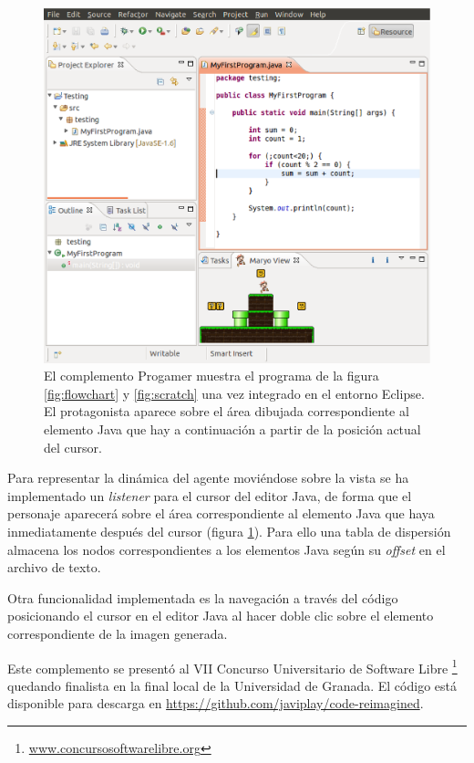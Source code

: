 \documentclass{llncs}
\begin{document}
\begin{figure}[ht]
\begin{center}
\includegraphics[scale=0.5]{images/eclipse.eps}
\caption{El complemento Progamer muestra el programa de la figura \ref{fig:flowchart} y \ref{fig:scratch} una vez integrado en el entorno Eclipse. El protagonista aparece sobre el área dibujada correspondiente al elemento Java que hay a continuación a partir de la posición actual del cursor.
\label{fig:eclipse}}
\end{center}
\end{figure}

Para representar la dinámica del agente moviéndose sobre la vista se ha
implementado un {\em listener} para el cursor del editor Java, de forma que el personaje aparecerá sobre el área correspondiente al elemento Java que haya inmediatamente después del cursor (figura \ref{fig:eclipse}). Para ello una tabla de dispersión almacena los nodos correspondientes a los elementos Java según su {\em offset} en el archivo de texto.

Otra funcionalidad implementada es la navegación a través del código posicionando el cursor en el editor Java al hacer doble clic sobre el elemento correspondiente de la imagen generada.

Este complemento se presentó al VII Concurso Universitario de Software Libre \footnote{\url{www.concursosoftwarelibre.org}} quedando finalista en la final local de la Universidad de Granada. El código está disponible para descarga en \url{https://github.com/javiplay/code-reimagined}.
\end{document}
